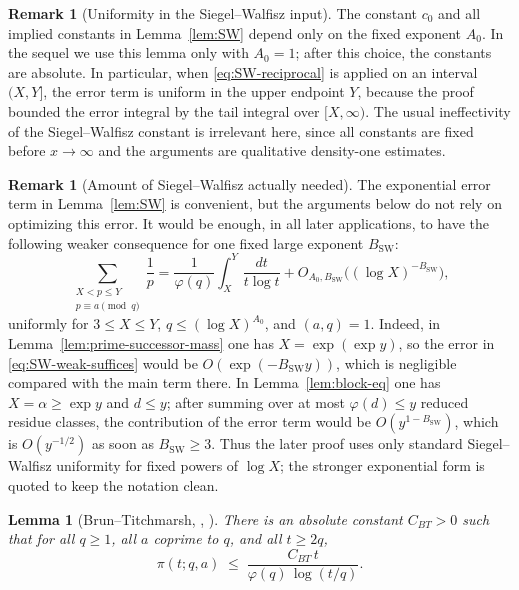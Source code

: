 \documentclass[11pt,reqno]{amsart}
\theoremstyle{plain}
\newtheorem{lemma}[theorem]{Lemma}
\theoremstyle{definition}
\newtheorem{remark}[theorem]{Remark}
\begin{document}
\begin{remark}[Uniformity in the Siegel--Walfisz input]\label{rem:SW-uniformity}
The constant $c_0$ and all implied constants in Lemma~\ref{lem:SW}
depend only on the fixed exponent $A_0$. In the sequel we use this lemma
only with $A_0=1$; after this choice, the constants are absolute. In particular,
when \eqref{eq:SW-reciprocal} is applied on an interval $(X,Y]$, the error term
is uniform in the upper endpoint $Y$, because the proof bounded the error
integral by the tail integral over $[X,\infty)$. The usual ineffectivity of the
Siegel--Walfisz constant is irrelevant here, since all constants are fixed
before $x\to\infty$ and the arguments are qualitative density-one estimates.
\end{remark}

\begin{remark}[Amount of Siegel--Walfisz actually needed]\label{rem:SW-strength-needed}
The exponential error term in Lemma~\ref{lem:SW} is convenient, but the
arguments below do not rely on optimizing this error. It would be enough, in
all later applications, to have the following weaker consequence for one fixed
large exponent $B_{\mathrm{SW}}$:
\begin{equation}\label{eq:SW-weak-suffices}
\sum_{\substack{X<p\le Y\\ p\equiv a\pmod q}}\frac1p
=
\frac1{\varphi(q)}\int_X^Y\frac{dt}{t\log t}
+
O_{A_0,B_{\mathrm{SW}}}\bigl((\log X)^{-B_{\mathrm{SW}}}\bigr),
\end{equation}
uniformly for $3\le X\le Y$, $q\le(\log X)^{A_0}$, and $(a,q)=1$.
Indeed, in Lemma~\ref{lem:prime-successor-mass} one has
$X=\exp(\exp y)$, so the error in \eqref{eq:SW-weak-suffices} would be
$O(\exp(-B_{\mathrm{SW}}y))$, which is negligible compared with the main term
there. In Lemma~\ref{lem:block-eq} one has $X=\alpha\ge \exp y$ and
$d\le y$; after summing over at most $\varphi(d)\le y$ reduced residue classes,
the contribution of the error term would be
$O(y^{1-B_{\mathrm{SW}}})$, which is $O(y^{-1/2})$ as soon as
$B_{\mathrm{SW}}\ge 3$. Thus the later proof uses only standard
Siegel--Walfisz uniformity for fixed powers of $\log X$; the stronger
exponential form is quoted to keep the notation clean.
\end{remark}

\begin{lemma}[Brun--Titchmarsh, {\cite[Thm.~6.6]{IwaniecKowalski}, \cite{MontgomeryVaughan}}]\label{lem:BT}
There is an absolute constant $C_{BT}>0$ such that for all $q\ge 1$, all $a$ coprime to $q$, and all $t\ge 2q$,
\begin{equation}\label{eq:BT}
\pi(t;q,a) \;\le\; \frac{C_{BT}\, t}{\varphi(q)\,\log(t/q)}.
\end{equation}
\end{lemma}
\end{document}
